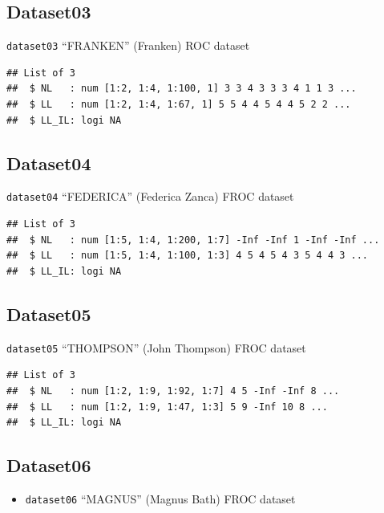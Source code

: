 \documentclass[
]{book}
\providecommand{\tightlist}{%
  \setlength{\itemsep}{0pt}\setlength{\parskip}{0pt}}
\begin{document}
\hypertarget{datasets-dataset03}{%
\subsection{Dataset03}\label{datasets-dataset03}}

\texttt{dataset03} ``FRANKEN'' (Franken) ROC dataset \citep{RN1995}

\begin{verbatim}
## List of 3
##  $ NL   : num [1:2, 1:4, 1:100, 1] 3 3 4 3 3 3 4 1 1 3 ...
##  $ LL   : num [1:2, 1:4, 1:67, 1] 5 5 4 4 5 4 4 5 2 2 ...
##  $ LL_IL: logi NA
\end{verbatim}

\hypertarget{datasets-dataset04}{%
\subsection{Dataset04}\label{datasets-dataset04}}

\texttt{dataset04} ``FEDERICA'' (Federica Zanca) FROC dataset \citep{zanca2009evaluation}

\begin{verbatim}
## List of 3
##  $ NL   : num [1:5, 1:4, 1:200, 1:7] -Inf -Inf 1 -Inf -Inf ...
##  $ LL   : num [1:5, 1:4, 1:100, 1:3] 4 5 4 5 4 3 5 4 4 3 ...
##  $ LL_IL: logi NA
\end{verbatim}

\hypertarget{datasets-dataset05}{%
\subsection{Dataset05}\label{datasets-dataset05}}

\texttt{dataset05} ``THOMPSON'' (John Thompson) FROC dataset \citep{RN2368}

\begin{verbatim}
## List of 3
##  $ NL   : num [1:2, 1:9, 1:92, 1:7] 4 5 -Inf -Inf 8 ...
##  $ LL   : num [1:2, 1:9, 1:47, 1:3] 5 9 -Inf 10 8 ...
##  $ LL_IL: logi NA
\end{verbatim}

\hypertarget{datasets-dataset06}{%
\subsection{Dataset06}\label{datasets-dataset06}}

\begin{itemize}
\tightlist
\item
  \texttt{dataset06} ``MAGNUS'' (Magnus Bath) FROC dataset \citep{RN1929}
\end{itemize}
\end{document}
